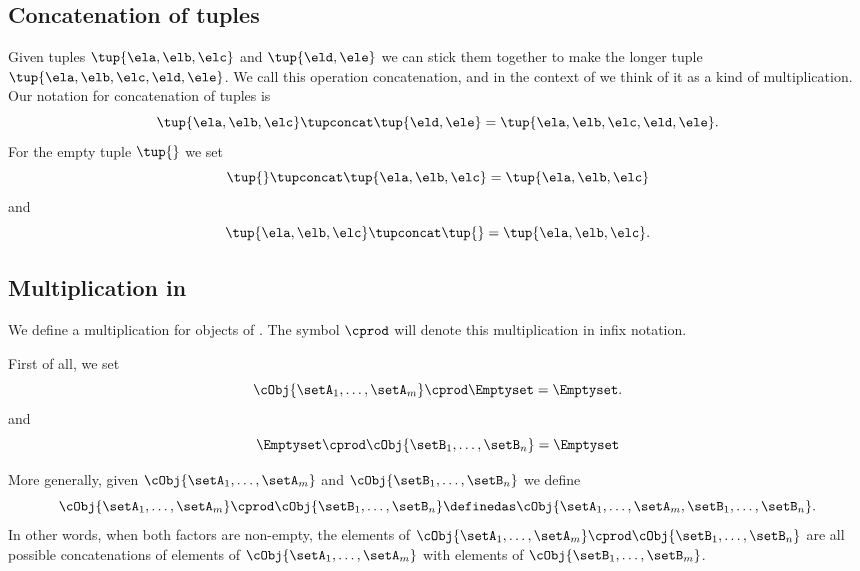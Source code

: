 \subsection{Concatenation of tuples}

Given tuples $\tup{\ela, \elb, \elc}$ and $\tup{\eld, \ele}$ we can stick them together to make the longer tuple $\tup{\ela, \elb, \elc, \eld, \ele}$.
We call this operation concatenation, and in the context of \cCat{\Set} we think of it as a kind of multiplication.
Our notation for concatenation of tuples is
\begin{equation}
    \tup{\ela, \elb, \elc} \tupconcat \tup{\eld, \ele} = \tup{\ela, \elb, \elc, \eld, \ele}.
\end{equation}
For the empty tuple $\tup{  }$ we set
\begin{equation}
    \tup{} \tupconcat \tup{\ela, \elb, \elc}  = \tup{\ela, \elb, \elc}
\end{equation}
and
\begin{equation}
    \tup{\ela, \elb, \elc}  \tupconcat \tup{ } = \tup{\ela, \elb, \elc}.
\end{equation}


\subsection{Multiplication in \cCat{\Set}}

We define a multiplication for objects of \cCat{\Set}. The symbol $\cprod$ will denote this multiplication in infix notation. 

First of all, we set 
\begin{equation}
    \cObj{\setA_1, \dots, \setA_m} \cprod \Emptyset = \Emptyset.
\end{equation}
and
\begin{equation}
    \Emptyset \cprod \cObj{\setB_1, \dots, \setB_n} = \Emptyset
\end{equation}

More generally, given $\cObj{\setA_1, \dots, \setA_m}$ and $\cObj{\setB_1,  \dots, \setB_n}$ we define
\begin{equation}
\label{eq:strict-monoidal-product-sets}
   \cObj{\setA_1, \dots, \setA_m} \cprod \cObj{\setB_1, \dots, \setB_n} \definedas \cObj{\setA_1, \dots, \setA_m, \setB_1,  \dots, \setB_n}.
\end{equation}
In other words, when both factors are non-empty, the elements of $\cObj{\setA_1, \dots, \setA_m} \cprod \cObj{\setB_1, \dots, \setB_n}$ are all possible concatenations of elements of $\cObj{\setA_1, \dots, \setA_m}$ with elements of $\cObj{\setB_1, \dots, \setB_m}$.

